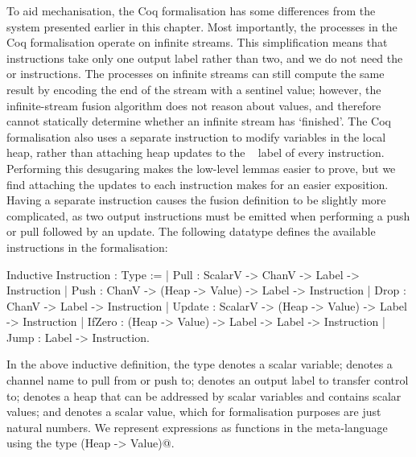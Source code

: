 To aid mechanisation, the Coq formalisation has some differences from the system presented earlier in this chapter.
Most importantly, the processes in the Coq formalisation operate on infinite streams.
This simplification means that \Hs@pull@ instructions take only one output label rather than two, and we do not need the \Hs@close@ or \Hs@exit@ instructions.
The processes on infinite streams can still compute the same result by encoding the end of the stream with a sentinel value; however, the infinite-stream fusion algorithm does not reason about values, and therefore cannot statically determine whether an infinite stream has `finished'.
The Coq formalisation also uses a separate \Hs@update@ instruction to modify variables in the local heap, rather than attaching heap updates to the \Next~ label of every instruction.
Performing this desugaring makes the low-level lemmas easier to prove, but we find attaching the updates to each instruction makes for an easier exposition.
Having a separate \Hs@update@ instruction causes the fusion definition to be slightly more complicated, as two output instructions must be emitted when performing a push or pull followed by an update.
The following datatype defines the available instructions in the formalisation:
\begin{coq}
Inductive Instruction : Type :=
  | Pull    : ScalarV -> ChanV           -> Label -> Instruction
  | Push    : ChanV   -> (Heap -> Value) -> Label -> Instruction
  | Drop    : ChanV                      -> Label -> Instruction
  | Update  : ScalarV -> (Heap -> Value) -> Label -> Instruction
  | IfZero  : (Heap -> Value)   -> Label -> Label -> Instruction
  | Jump    :                               Label -> Instruction.
\end{coq}

In the above inductive definition, the type \Hs@ScalarV@ denotes a scalar variable; \Hs@ChanV@ denotes a channel name to pull from or push to; \Hs@Label@ denotes an output label to transfer control to; \Hs@Heap@ denotes a heap that can be addressed by scalar variables and contains scalar values; and \Hs@Value@ denotes a scalar value, which for formalisation purposes are just natural numbers.
We represent expressions as functions in the meta-language using the type \Hs@(Heap -> Value)@.

